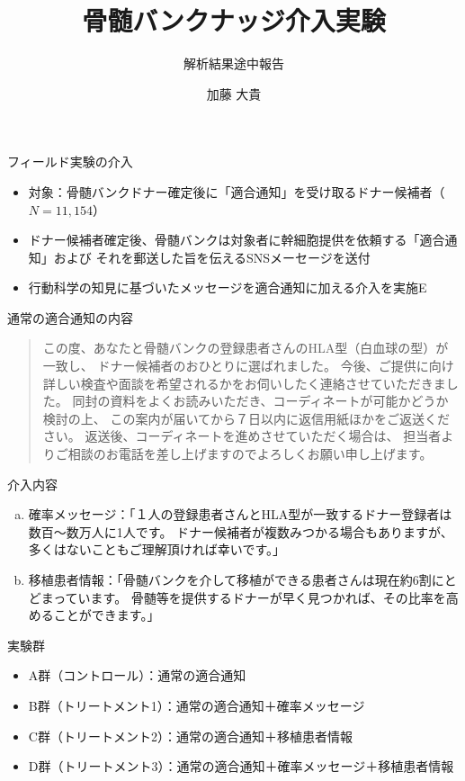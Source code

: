 \documentclass[
      aspectratio=169,
        12pt,
    ]{beamer}
\title{骨髄バンクナッジ介入実験}
\subtitle{解析結果途中報告}
\author{%
        加藤 大貴\inst{1}
    \and
      }
\providecommand{\tightlist}{%
  \setlength{\itemsep}{0pt}\setlength{\parskip}{0pt}}
\begin{document}
\frame{\titlepage}


\begin{frame}
\end{frame}

\begin{frame}{フィールド実験の介入}
\protect\hypertarget{ux30d5ux30a3ux30fcux30ebux30c9ux5b9fux9a13ux306eux4ecbux5165}{}
\begin{itemize}
\tightlist
\item
  対象：骨髄バンクドナー確定後に「適合通知」を受け取るドナー候補者（\(N = 11,154\)）
\item
  ドナー候補者確定後、骨髄バンクは対象者に幹細胞提供を依頼する「適合通知」および
  それを郵送した旨を伝えるSNSメーセージを送付
\item
  行動科学の知見に基づいたメッセージを適合通知に加える介入を実施E
\end{itemize}
\end{frame}

\begin{frame}{通常の適合通知の内容}
\protect\hypertarget{ux901aux5e38ux306eux9069ux5408ux901aux77e5ux306eux5185ux5bb9}{}
\begin{quote}
この度、あなたと骨髄バンクの登録患者さんのHLA型（白血球の型）が一致し、
ドナー候補者のおひとりに選ばれました。
今後、ご提供に向け詳しい検査や面談を希望されるかをお伺いしたく連絡させていただきました。
同封の資料をよくお読みいただき、コーディネートが可能かどうか検討の上、
この案内が届いてから７日以内に返信用紙ほかをご返送ください。
返送後、コーディネートを進めさせていただく場合は、
担当者よりご相談のお電話を差し上げますのでよろしくお願い申し上げます。
\end{quote}
\end{frame}

\begin{frame}{介入内容}
\protect\hypertarget{ux4ecbux5165ux5185ux5bb9}{}
\begin{enumerate}
[a.]
\tightlist
\item
  確率メッセージ：「１人の登録患者さんとHLA型が一致するドナー登録者は数百〜数万人に1人です。
  ドナー候補者が複数みつかる場合もありますが、多くはないこともご理解頂ければ幸いです。」
\item
  移植患者情報：「骨髄バンクを介して移植ができる患者さんは現在約6割にとどまっています。
  骨髄等を提供するドナーが早く見つかれば、その比率を高めることができます。」
\end{enumerate}
\end{frame}

\begin{frame}{実験群}
\protect\hypertarget{ux5b9fux9a13ux7fa4}{}
\begin{itemize}
\tightlist
\item
  A群（コントロール）：通常の適合通知
\item
  B群（トリートメント1）：通常の適合通知＋確率メッセージ
\item
  C群（トリートメント2）：通常の適合通知＋移植患者情報
\item
  D群（トリートメント3）：通常の適合通知＋確率メッセージ＋移植患者情報
\end{itemize}
\end{frame}
\end{document}
